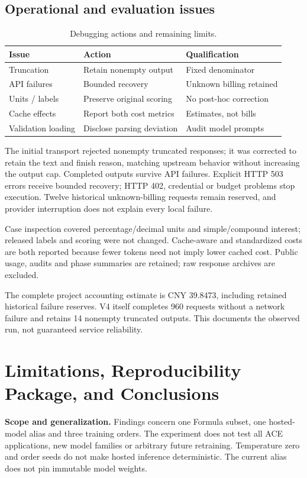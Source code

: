 \documentclass[10pt,a4paper]{article}
\newcommand{\smalltable}{\small\setlength{\tabcolsep}{4pt}}
\begin{document}
\subsection{Operational and evaluation issues}
\begin{table}[h!]
\centering\smalltable
\begin{tabularx}{\linewidth}{P{29mm}Y Y}
\toprule
Issue & Action & Qualification \\
\midrule
Truncation & Retain nonempty output & Fixed denominator \\
API failures & Bounded recovery & Unknown billing retained \\
Units / labels & Preserve original scoring & No post-hoc correction \\
Cache effects & Report both cost metrics & Estimates, not bills \\
Validation loading & Disclose parsing deviation & Audit model prompts \\
\bottomrule
\end{tabularx}
\caption{Debugging actions and remaining limits.}
\end{table}
The initial transport rejected nonempty truncated responses; it was corrected to retain the text and finish reason, matching upstream behavior without increasing the output cap. Completed outputs survive API failures. Explicit HTTP 503 errors receive bounded recovery; HTTP 402, credential or budget problems stop execution. Twelve historical unknown-billing requests remain reserved, and provider interruption does not explain every local failure.

Case inspection covered percentage/decimal units and simple/compound interest; released labels and scoring were not changed. Cache-aware and standardized costs are both reported because fewer tokens need not imply lower cached cost. Public usage, audits and phase summaries are retained; raw response archives are excluded.

The complete project accounting estimate is CNY 39.8473, including retained historical failure reserves. V4 itself completes 960 requests without a network failure and retains 14 nonempty truncated outputs. This documents the observed run, not guaranteed service reliability.

\clearpage
\section{Limitations, Reproducibility Package, and Conclusions}
\label{sec:limits}
\textbf{Scope and generalization.} Findings concern one Formula subset, one hosted-model alias and three training orders. The experiment does not test all ACE applications, new model families or arbitrary future retraining. Temperature zero and order seeds do not make hosted inference deterministic. The current alias does not pin immutable model weights.
\end{document}
